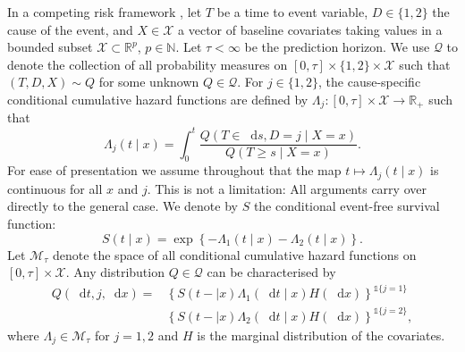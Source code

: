 \documentclass[11pt]{article}
\theoremstyle{thmstyleone}%
\theoremstyle{thmstyletwo}%
\theoremstyle{thmstylethree}%
\newcommand{\R}{\mathbb{R}}
\newcommand{\N}{\mathbb{N}}
\newcommand*\diff{\mathop{}\!\mathrm{d}}
\newcommand{\1}{\mathds{1}}
\begin{document}
In a competing risk framework \citep{andersen2012statistical}, let
\( T\) be a time to event variable, \(D\in\{1,2\}\) the cause of the
event, and $X \in \mathcal{X}$ a vector of baseline covariates taking
values in a bounded subset \( \mathcal{X} \subset \R^p \),
\( p\in\N \). Let $\tau< \infty$ be the prediction horizon. We use
\( \mathcal{Q} \) to denote the collection of all probability measures
on \( [0,\tau] \times \{1,2\}\times \mathcal{X} \) such that
\( (T, D, X) \sim Q \) for some unknown \( Q \in \mathcal{Q} \). For
\(j\in\{1,2\}\), the cause-specific conditional cumulative hazard
functions are defined by
\( \Lambda_{j} \colon [0, \tau] \times \mathcal{X} \rightarrow \R_+ \)
such that
\begin{equation*}
  \Lambda_{j}(t \mid x) = \int_0^t\frac{  Q(T \in \diff s, D=j \mid X=x )}{Q(T \geq s \mid X=x )}.
\end{equation*}
For ease of presentation we assume throughout that the map
\( t\mapsto \Lambda_j(t \mid x) \) is continuous for all \( x \) and
\( j \). This is not a limitation: All arguments carry over directly
to the general case. We denote by \(S\) the conditional event-free
survival function:
\begin{equation}
  \label{eq:surv-def}
  S(t \mid x)=\exp\left\{-\Lambda_{1}(t \mid x)-\Lambda_{2}(t \mid x)\right\}.
\end{equation}
Let \( \mathcal{M}_{\tau}\) denote the space of all conditional cumulative hazard
functions on \( [0,\tau] \times\mathcal{X}\). Any distribution
\( Q \in \mathcal{Q} \) can be characterised by
\begin{equation*}
  \label{eq:parametrizeQ}
  \begin{split}
    Q(\diff t,j,\diff x)=& \left\{S(t- \mid x)\Lambda_1(\diff t \mid x)H(\diff x)\right\}^{\1{\{j=1\}}}\\
                         &  \left\{S(t- \mid x)\Lambda_2(\diff t \mid x)H(\diff x)\right\}^{\1{\{j=2\}}},
  \end{split}
\end{equation*}
where \(\Lambda_{j} \in \mathcal{M}_{\tau}\) for \(j=1,2\) and \(H\) is the marginal
distribution of the covariates.
\end{document}
